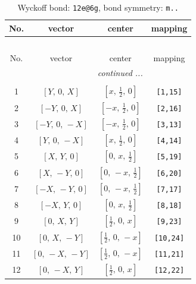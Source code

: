 \documentclass[fleqn,8pt]{jsarticle}
\begin{document}
\renewcommand{\arraystretch}{1.2}
\begin{longtable}{cccc}
\caption{Wyckoff bond: {\tt 12e@6g}, bond symmetry: {\tt m..}}
 \\
 \hline \hline
No. & vector & center & mapping \\ \hline \endfirsthead

\multicolumn{3}{l}{\tablename\ \thetable{}} \\
 \hline \hline
No. & vector & center & mapping \\ \hline \endhead

 \hline \hline
\multicolumn{3}{r}{\footnotesize\it continued ...} \\ \endfoot

 \hline \hline
\multicolumn{3}{r}{} \\ \endlastfoot

1 & $\left[ Y,\, 0,\, X \right]$ & $\left[ x,\, \frac{1}{2},\, 0 \right]$ & {\tt [1,15]} \\ \hline
2 & $\left[ - Y,\, 0,\, X \right]$ & $\left[ - x,\, \frac{1}{2},\, 0 \right]$ & {\tt [2,16]} \\ \hline
3 & $\left[ - Y,\, 0,\, - X \right]$ & $\left[ - x,\, \frac{1}{2},\, 0 \right]$ & {\tt [3,13]} \\ \hline
4 & $\left[ Y,\, 0,\, - X \right]$ & $\left[ x,\, \frac{1}{2},\, 0 \right]$ & {\tt [4,14]} \\ \hline
5 & $\left[ X,\, Y,\, 0 \right]$ & $\left[ 0,\, x,\, \frac{1}{2} \right]$ & {\tt [5,19]} \\ \hline
6 & $\left[ X,\, - Y,\, 0 \right]$ & $\left[ 0,\, - x,\, \frac{1}{2} \right]$ & {\tt [6,20]} \\ \hline
7 & $\left[ - X,\, - Y,\, 0 \right]$ & $\left[ 0,\, - x,\, \frac{1}{2} \right]$ & {\tt [7,17]} \\ \hline
8 & $\left[ - X,\, Y,\, 0 \right]$ & $\left[ 0,\, x,\, \frac{1}{2} \right]$ & {\tt [8,18]} \\ \hline
9 & $\left[ 0,\, X,\, Y \right]$ & $\left[ \frac{1}{2},\, 0,\, x \right]$ & {\tt [9,23]} \\ \hline
10 & $\left[ 0,\, X,\, - Y \right]$ & $\left[ \frac{1}{2},\, 0,\, - x \right]$ & {\tt [10,24]} \\ \hline
11 & $\left[ 0,\, - X,\, - Y \right]$ & $\left[ \frac{1}{2},\, 0,\, - x \right]$ & {\tt [11,21]} \\ \hline
12 & $\left[ 0,\, - X,\, Y \right]$ & $\left[ \frac{1}{2},\, 0,\, x \right]$ & {\tt [12,22]} \\
\end{longtable}
\end{document}
